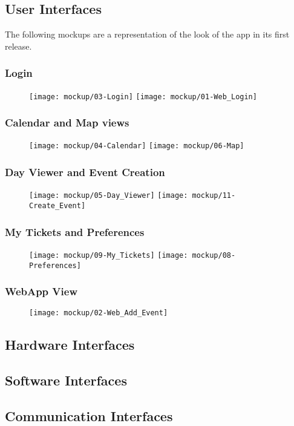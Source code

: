 \subsection{User Interfaces}
\label{subsect:User Interfaces}
	The following mockups are a representation of the look of the app in its first release.
	\subsubsection{Login}
	\begin{figure}[H]
	\texttt{[image: mockup/03-Login]}
	\vspace{2.5cm}
	\texttt{[image: mockup/01-Web\_Login]}
	\centering 
	\end{figure}
	
	\subsubsection{Calendar and Map views}
	\begin{figure}[H]
	\texttt{[image: mockup/04-Calendar]}
	\hspace{2.5cm}
	\texttt{[image: mockup/06-Map]}
	\centering 
	\end{figure}
	
	\subsubsection{Day Viewer and Event Creation}
	\begin{figure}[H]
	\texttt{[image: mockup/05-Day\_Viewer]}
	\hspace{2.5cm}
	\texttt{[image: mockup/11-Create\_Event]}
	\centering 
	\end{figure}
	
	\subsubsection{My Tickets and Preferences}
	\begin{figure}[H]
	\texttt{[image: mockup/09-My\_Tickets]}
	\hspace{2.5cm}
	\texttt{[image: mockup/08-Preferences]}
	\centering 
	\end{figure}
	
	\subsubsection{WebApp View}
	\begin{figure}[H]
	\texttt{[image: mockup/02-Web\_Add\_Event]}
	\centering 
	\end{figure}
\subsection{Hardware Interfaces}
\label{subsect:Hardware Interfaces}
\subsection{Software Interfaces}
\label{subsect:Software Interfaces}
\subsection{Communication Interfaces}
\label{subsect:Communication Interfaces}
